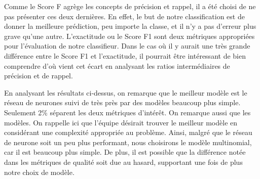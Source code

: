 Comme le Score F agrège les concepts de précision et rappel, il a été choisi de ne pas présenter ces deux dernières. En effet, le but de notre classification est de donner la meilleure prédiction, peu importe la classe, et il n'y a pas d'erreur plus grave qu'une autre. L'exactitude ou le Score F1 sont deux métriques appropriées pour l'évaluation de notre classifieur. Dans le cas où il y aurait une très grande différence entre le Score F1 et l'exactitude, il pourrait être intéressant de bien comprendre d'où vient cet écart en analysant les ratios intermédiaires de précision et de rappel.

\begin{table}[H]
	
\caption{\label{tab:}Performances des différents modèles sur le jeu de données de test selon les différentes mesures de performance.}
\centering
{}

\end{table}

En analysant les résultats ci-dessus, on remarque que le meilleur modèle est le réseau de neurones suivi de très près par des modèles beaucoup plus simple. Seulement 2\% séparent les deux métriques d'intérêt. On remarque aussi que les modèles. On rappelle ici que l'équipe désirait trouver le meilleur modèle en considérant une complexité appropriée au problème. Ainsi, malgré que le réseau de neurone soit un peu plus performant, nous choisirons le modèle multinomial, car il est beaucoup plus simple. De plus, il est possible que la différence notée dans les métriques de qualité soit due au hasard, supportant une fois de plus notre choix de modèle. 
 
